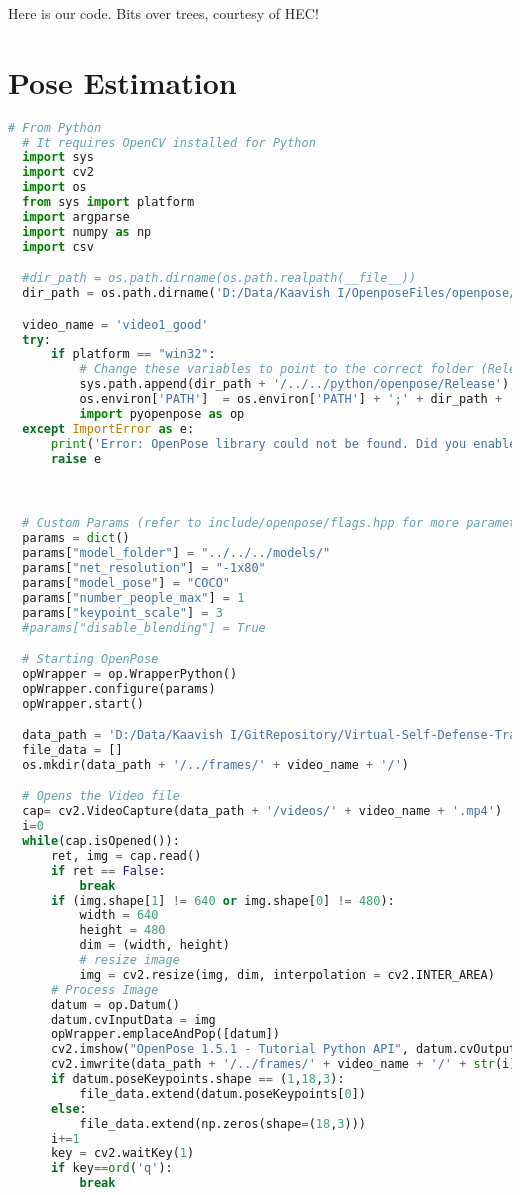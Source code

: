 Here is our code. Bits over trees, courtesy of HEC!

\section{Pose Estimation}
\begin{lstlisting}[language=python, showstringspaces=false,frame=single]
  # From Python
  # It requires OpenCV installed for Python
  import sys
  import cv2
  import os
  from sys import platform
  import argparse
  import numpy as np
  import csv

  #dir_path = os.path.dirname(os.path.realpath(__file__))
  dir_path = os.path.dirname('D:/Data/Kaavish I/OpenposeFiles/openpose/build/')

  video_name = 'video1_good'
  try:
      if platform == "win32":
          # Change these variables to point to the correct folder (Release/x64 etc.)
          sys.path.append(dir_path + '/../../python/openpose/Release');
          os.environ['PATH']  = os.environ['PATH'] + ';' + dir_path + '/../../x64/Release;' +  dir_path + '/../../bin;'
          import pyopenpose as op
  except ImportError as e:
      print('Error: OpenPose library could not be found. Did you enable `BUILD_PYTHON` in CMake and have this Python script in the right folder?')
      raise e



  # Custom Params (refer to include/openpose/flags.hpp for more parameters)
  params = dict()
  params["model_folder"] = "../../../models/"
  params["net_resolution"] = "-1x80"
  params["model_pose"] = "COCO"
  params["number_people_max"] = 1
  params["keypoint_scale"] = 3
  #params["disable_blending"] = True

  # Starting OpenPose
  opWrapper = op.WrapperPython()
  opWrapper.configure(params)
  opWrapper.start()

  data_path = 'D:/Data/Kaavish I/GitRepository/Virtual-Self-Defense-Trainer/Code/PoseEvaluation/videoData'
  file_data = []
  os.mkdir(data_path + '/../frames/' + video_name + '/')

  # Opens the Video file
  cap= cv2.VideoCapture(data_path + '/videos/' + video_name + '.mp4')
  i=0
  while(cap.isOpened()):
      ret, img = cap.read()
      if ret == False:
          break
      if (img.shape[1] != 640 or img.shape[0] != 480):
          width = 640
          height = 480
          dim = (width, height)
          # resize image
          img = cv2.resize(img, dim, interpolation = cv2.INTER_AREA)
      # Process Image
      datum = op.Datum()
      datum.cvInputData = img
      opWrapper.emplaceAndPop([datum])
      cv2.imshow("OpenPose 1.5.1 - Tutorial Python API", datum.cvOutputData)
      cv2.imwrite(data_path + '/../frames/' + video_name + '/' + str(i)+'.png',datum.cvOutputData)
      if datum.poseKeypoints.shape == (1,18,3):
          file_data.extend(datum.poseKeypoints[0])
      else:
          file_data.extend(np.zeros(shape=(18,3)))
      i+=1
      key = cv2.waitKey(1)
      if key==ord('q'):
          break


\end{lstlisting}
